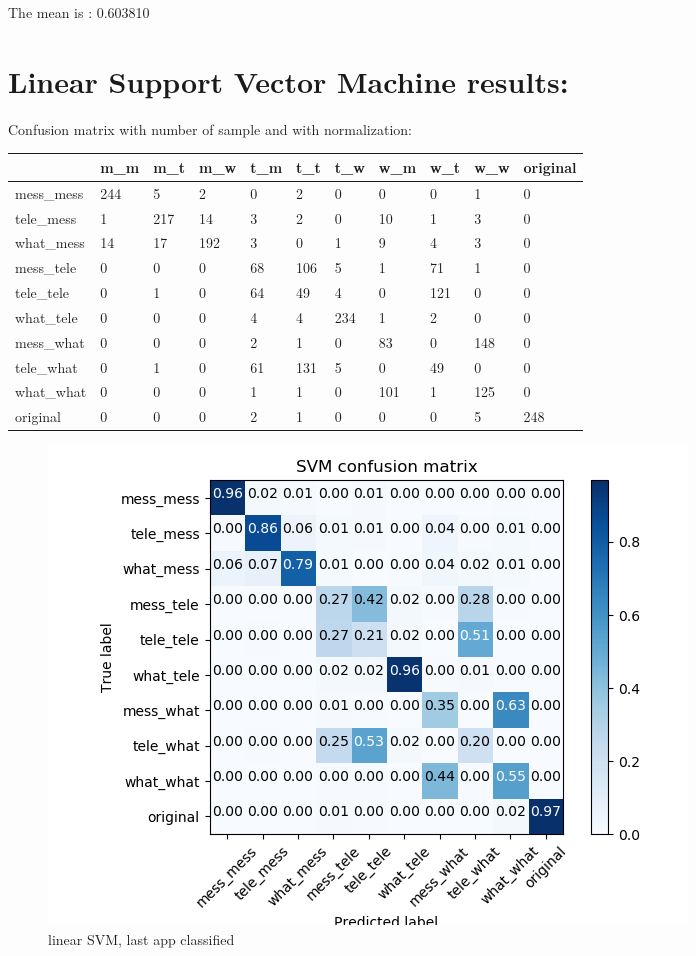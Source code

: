 The mean is : 0.603810\section{Linear Support Vector Machine results:} 
Confusion matrix with number of sample and with normalization:
 {\def\arraystretch{1.3} 
 \begin{table}[H] 
\centering 
\begin{tabular}{|l|l|l|l|l|l|l|l|l|l|l|} 
\hline 
  &m\_m  &m\_t  &m\_w  &t\_m  &t\_t  &t\_w  &w\_m  &w\_t  &w\_w  &original  \\ \hline
mess\_mess  &244  &5  &2  &0  &2  &0  &0  &0  &1  &0  \\ \hline
tele\_mess  &1  &217  &14  &3  &2  &0  &10  &1  &3  &0  \\ \hline
what\_mess  &14  &17  &192  &3  &0  &1  &9  &4  &3  &0  \\ \hline
mess\_tele  &0  &0  &0  &68  &106  &5  &1  &71  &1  &0  \\ \hline
tele\_tele  &0  &1  &0  &64  &49  &4  &0  &121  &0  &0  \\ \hline
what\_tele  &0  &0  &0  &4  &4  &234  &1  &2  &0  &0  \\ \hline
mess\_what  &0  &0  &0  &2  &1  &0  &83  &0  &148  &0  \\ \hline
tele\_what  &0  &1  &0  &61  &131  &5  &0  &49  &0  &0  \\ \hline
what\_what  &0  &0  &0  &1  &1  &0  &101  &1  &125  &0  \\ \hline
original  &0  &0  &0  &2  &1  &0  &0  &0  &5  &248  \\ \hline
\end{tabular} 
\end{table} }

 \begin{figure}[H] 
\centering 
\includegraphics[scale=.6]{images/new_met_lsvm_initial_double_complete.png} 
\caption{linear SVM, last app classified} 
\end{figure} 


